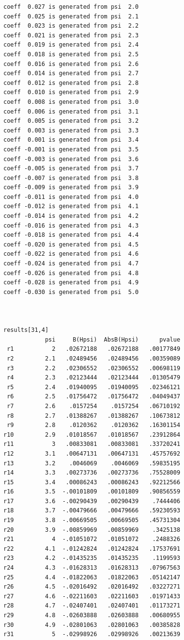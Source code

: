 \documentclass[
  10pt,
]{book}
\begin{document}
\begin{verbatim}
coeff  0.027 is generated from psi  2.0
coeff  0.025 is generated from psi  2.1
coeff  0.023 is generated from psi  2.2
coeff  0.021 is generated from psi  2.3
coeff  0.019 is generated from psi  2.4
coeff  0.018 is generated from psi  2.5
coeff  0.016 is generated from psi  2.6
coeff  0.014 is generated from psi  2.7
coeff  0.012 is generated from psi  2.8
coeff  0.010 is generated from psi  2.9
coeff  0.008 is generated from psi  3.0
coeff  0.006 is generated from psi  3.1
coeff  0.005 is generated from psi  3.2
coeff  0.003 is generated from psi  3.3
coeff  0.001 is generated from psi  3.4
coeff -0.001 is generated from psi  3.5
coeff -0.003 is generated from psi  3.6
coeff -0.005 is generated from psi  3.7
coeff -0.007 is generated from psi  3.8
coeff -0.009 is generated from psi  3.9
coeff -0.011 is generated from psi  4.0
coeff -0.012 is generated from psi  4.1
coeff -0.014 is generated from psi  4.2
coeff -0.016 is generated from psi  4.3
coeff -0.018 is generated from psi  4.4
coeff -0.020 is generated from psi  4.5
coeff -0.022 is generated from psi  4.6
coeff -0.024 is generated from psi  4.7
coeff -0.026 is generated from psi  4.8
coeff -0.028 is generated from psi  4.9
coeff -0.030 is generated from psi  5.0



results[31,4]
            psi     B(Hpsi)  AbsB(Hpsi)      pvalue
 r1           2   .02672188   .02672188   .00177849
 r2         2.1   .02489456   .02489456   .00359089
 r3         2.2   .02306552   .02306552   .00698119
 r4         2.3   .02123444   .02123444   .01305479
 r5         2.4   .01940095   .01940095   .02346121
 r6         2.5   .01756472   .01756472   .04049437
 r7         2.6    .0157254    .0157254   .06710192
 r8         2.7   .01388267   .01388267   .10673812
 r9         2.8    .0120362    .0120362   .16301154
r10         2.9   .01018567   .01018567   .23912864
r11           3   .00833081   .00833081   .33720241
r12         3.1   .00647131   .00647131   .45757692
r13         3.2    .0046069    .0046069   .59835195
r14         3.3   .00273736   .00273736   .75528009
r15         3.4   .00086243   .00086243   .92212566
r16         3.5  -.00101809   .00101809   .90856559
r17         3.6  -.00290439   .00290439    .7444406
r18         3.7  -.00479666   .00479666   .59230593
r19         3.8  -.00669505   .00669505   .45731304
r20         3.9  -.00859969   .00859969    .3425138
r21           4  -.01051072   .01051072    .2488326
r22         4.1  -.01242824   .01242824   .17537691
r23         4.2  -.01435235   .01435235    .1199593
r24         4.3  -.01628313   .01628313   .07967563
r25         4.4  -.01822063   .01822063   .05142147
r26         4.5  -.02016492   .02016492   .03227271
r27         4.6  -.02211603   .02211603   .01971433
r28         4.7  -.02407401   .02407401   .01173271
r29         4.8  -.02603888   .02603888   .00680955
r30         4.9  -.02801063   .02801063   .00385828
r31           5  -.02998926   .02998926   .00213639


\end{verbatim}
\end{document}
